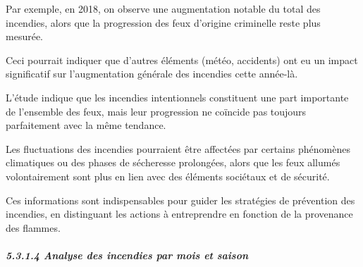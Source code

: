 \documentclass[
]{article}
\newenvironment{Shaded}{\begin{snugshade}}{\end{snugshade}}
\newcommand{\AttributeTok}[1]{\textcolor[rgb]{0.13,0.29,0.53}{#1}}
\newcommand{\DecValTok}[1]{\textcolor[rgb]{0.00,0.00,0.81}{#1}}
\newcommand{\FunctionTok}[1]{\textcolor[rgb]{0.13,0.29,0.53}{\textbf{#1}}}
\newcommand{\NormalTok}[1]{#1}
\newcommand{\OtherTok}[1]{\textcolor[rgb]{0.56,0.35,0.01}{#1}}
\newcommand{\SpecialCharTok}[1]{\textcolor[rgb]{0.81,0.36,0.00}{\textbf{#1}}}
\newcommand{\StringTok}[1]{\textcolor[rgb]{0.31,0.60,0.02}{#1}}
\begin{document}
Par exemple, en 2018, on observe une augmentation notable du total des
incendies, alors que la progression des feux d'origine criminelle reste
plus mesurée.

Ceci pourrait indiquer que d'autres éléments (météo, accidents) ont eu
un impact significatif sur l'augmentation générale des incendies cette
année-là.

L'étude indique que les incendies intentionnels constituent une part
importante de l'ensemble des feux, mais leur progression ne coïncide pas
toujours parfaitement avec la même tendance.

Les fluctuations des incendies pourraient être affectées par certains
phénomènes climatiques ou des phases de sécheresse prolongées, alors que
les feux allumés volontairement sont plus en lien avec des éléments
sociétaux et de sécurité.

Ces informations sont indispensables pour guider les stratégies de
prévention des incendies, en distinguant les actions à entreprendre en
fonction de la provenance des flammes.

\subparagraph{5.3.1.4 Analyse des incendies par mois et
saison}\label{analyse-des-incendies-par-mois-et-saison}

\begin{Shaded}
\end{Shaded}
\end{document}
